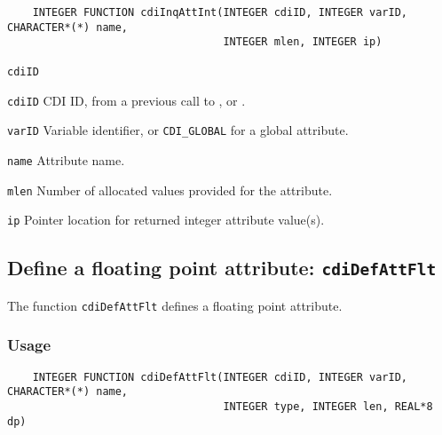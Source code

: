 \begin{verbatim}
    INTEGER FUNCTION cdiInqAttInt(INTEGER cdiID, INTEGER varID, CHARACTER*(*) name, 
                                  INTEGER mlen, INTEGER ip)
\end{verbatim}

\hspace*{4mm}\begin{minipage}[]{15cm}
\begin{deflist}{\texttt{cdiID}\ }
\item[\texttt{cdiID}]
CDI ID, from a previous call to {}, {} or {}.
\item[\texttt{varID}]
Variable identifier, or {\texttt{CDI\_GLOBAL}} for a global attribute.
\item[\texttt{name}]
Attribute name.
\item[\texttt{mlen}]
Number of allocated values provided for the attribute.
\item[\texttt{ip}]
Pointer location for returned integer attribute value(s).

\end{deflist}
\end{minipage}


\subsection{Define a floating point attribute: \texttt{cdiDefAttFlt}}
\label{cdiDefAttFlt}

The function {\texttt{cdiDefAttFlt}} defines a floating point attribute.

\subsubsection*{Usage}

\begin{verbatim}
    INTEGER FUNCTION cdiDefAttFlt(INTEGER cdiID, INTEGER varID, CHARACTER*(*) name, 
                                  INTEGER type, INTEGER len, REAL*8 dp)
\end{verbatim}

